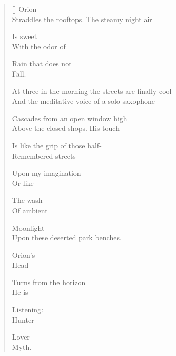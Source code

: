 \label{ch:poem_for_the_mythic_lover}
\settowidth{\versewidth}{Above the closed shops.\qquad\qquad His touch}
\begin{verse}[\versewidth]
\hspace*{3\vgap} Orion\\
Straddles the rooftops.   The steamy night air

Is sweet\\
With the odor of

Rain that does not\\
Fall.

At three in the morning the streets are finally cool\\
And the meditative voice of a solo saxophone

Cascades from an open window high\\
Above the closed shops. \hspace*{2\vgap} His touch

Is like the grip of those half-\\
Remembered streets

Upon my imagination\\
Or like

The wash\\
Of ambient

Moonlight\\
Upon these deserted park benches.

Orion's\\
Head

Turns from the horizon\\
He is

Listening:\\
Hunter

Lover\\
Myth.
\end{verse}
